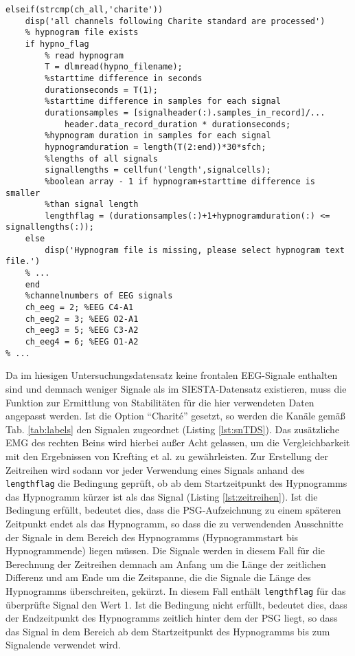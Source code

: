 \begin{lstlisting}[caption={Anpassung für den Charit\'{e}-Datensatz in der Funktion sn\_TDS.m}, label={lst:snTDS}]
% ...
elseif(strcmp(ch_all,'charite'))
    disp('all channels following Charite standard are processed')
    % hypnogram file exists
    if hypno_flag
        % read hypnogram
        T = dlmread(hypno_filename);
        %starttime difference in seconds
        durationseconds = T(1); 
        %starttime difference in samples for each signal
        durationsamples = [signalheader(:).samples_in_record]/...
            header.data_record_duration * durationseconds;
        %hypnogram duration in samples for each signal
        hypnogramduration = length(T(2:end))*30*sfch; 
        %lengths of all signals
        signallengths = cellfun('length',signalcells);
        %boolean array - 1 if hypnogram+starttime difference is smaller
        %than signal length 
        lengthflag = (durationsamples(:)+1+hypnogramduration(:) <= signallengths(:));
    else
        disp('Hypnogram file is missing, please select hypnogram text file.')
    % ...
    end
    %channelnumbers of EEG signals
    ch_eeg = 2; %EEG C4-A1
    ch_eeg2 = 3; %EEG O2-A1
    ch_eeg3 = 5; %EEG C3-A2
    ch_eeg4 = 6; %EEG O1-A2
% ...
\end{lstlisting}

Da im hiesigen Untersuchungsdatensatz keine frontalen EEG-Signale enthalten sind und demnach weniger Signale als im SIESTA-Datensatz existieren, muss die Funktion zur Ermittlung von Stabilitäten für die hier verwendeten Daten angepasst werden. Ist die Option "`Charit\'{e}"' gesetzt, so werden die Kanäle gemäß Tab. \ref{tab:labels} den Signalen zugeordnet (Listing \ref{lst:snTDS}). Das zusätzliche \acs{EMG} des rechten Beins wird hierbei außer Acht gelassen, um die Vergleichbarkeit mit den Ergebnissen von Krefting et al. zu gewährleisten. Zur Erstellung der Zeitreihen wird sodann vor jeder Verwendung eines Signals anhand des \texttt{lengthflag}  die Bedingung geprüft, ob ab dem Startzeitpunkt des Hypnogramms das Hypnogramm kürzer ist als das Signal (Listing \ref{lst:zeitreihen}). Ist die Bedingung erfüllt, bedeutet dies, dass die \acs{PSG}-Aufzeichnung zu einem späteren Zeitpunkt endet als das Hypnogramm, so dass die zu verwendenden Ausschnitte der Signale in dem Bereich des Hypnogramms (Hypnogrammstart bis Hypnogrammende) liegen müssen. Die Signale werden in diesem Fall für die Berechnung der Zeitreihen demnach am Anfang um die Länge der zeitlichen Differenz und am Ende um die Zeitspanne, die die Signale die Länge des Hypnogramms überschreiten, gekürzt. In diesem Fall enthält \texttt{lengthflag} für das überprüfte Signal den Wert 1. Ist die Bedingung nicht erfüllt, bedeutet dies, dass der Endzeitpunkt des Hypnogramms zeitlich hinter dem der \acs{PSG} liegt, so dass das Signal in dem Bereich ab dem Startzeitpunkt des Hypnogramms bis zum Signalende verwendet wird.\\

